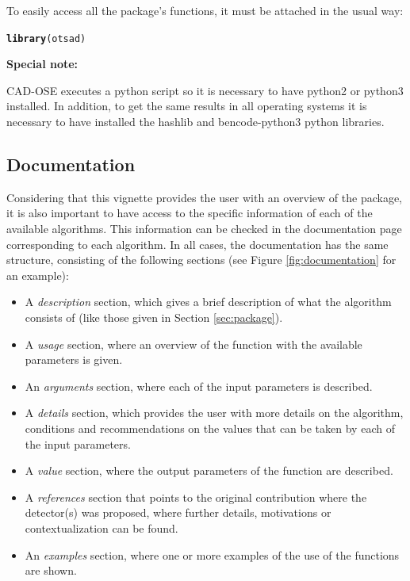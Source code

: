 \documentclass[a4paper]{article}\usepackage[]{graphicx}\usepackage[]{color}
\makeatletter
\newcommand{\hlstd}[1]{\textcolor[rgb]{0.345,0.345,0.345}{#1}}%
\newcommand{\hlkwd}[1]{\textcolor[rgb]{0.737,0.353,0.396}{\textbf{#1}}}%
\newenvironment{kframe}{%
 \def\at@end@of@kframe{}%
 \ifinner\ifhmode%
  \def\at@end@of@kframe{\end{minipage}}%
  \begin{minipage}{\columnwidth}%
 \fi\fi%
 \def\FrameCommand##1{\hskip\@totalleftmargin \hskip-\fboxsep
 \colorbox{shadecolor}{##1}\hskip-\fboxsep
     \hskip-\linewidth \hskip-\@totalleftmargin \hskip\columnwidth}%
 \MakeFramed {\advance\hsize-\width
   \@totalleftmargin\z@ \linewidth\hsize
   \@setminipage}}%
 {\par\unskip\endMakeFramed%
 \at@end@of@kframe}
\newenvironment{knitrout}{}{} %
\makeatother
\begin{document}
To easily access all the package’s functions, it must be attached in the usual way:

\begin{knitrout}
\color{fgcolor}\begin{kframe}
\begin{alltt}
\hlkwd{library}\hlstd{(otsad)}
\end{alltt}
\end{kframe}
\end{knitrout}

\textbf{Special note: }

CAD-OSE executes a python script so it is necessary to have python2 or python3 installed. In addition, to get the same results in all operating systems it is necessary to have installed the hashlib and bencode-python3 python libraries.

\subsection{Documentation}\label{sec:documentation}

Considering that this vignette provides the user with an overview of the  package, it is also important to have access to the specific information of each of the available algorithms. This information can be checked in the documentation page corresponding to each algorithm. In all cases, the documentation has the same structure, consisting of the following sections (see Figure \ref{fig:documentation} for an example):

\begin{itemize}
\item A \emph{description} section, which gives a brief description of what the algorithm consists of (like those given in Section \ref{sec:package}).
\item A \emph{usage} section, where an overview of the function with the available parameters is given.
\item An \emph{arguments} section, where each of the input parameters is described.
\item A \emph{details} section, which provides the user with more details on the algorithm, conditions and recommendations on the values that can be taken by each of the input parameters.
\item A \emph{value} section, where the output parameters of the function are described.
\item A \emph{references} section that points to the original contribution where the detector(s) was proposed, where further details, motivations or contextualization can be found.
\item An \emph{examples} section, where one or more examples of the use of the functions are shown.
\end{itemize}
\end{document}
